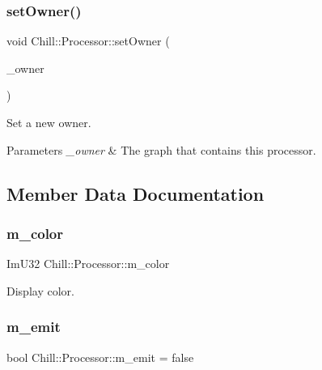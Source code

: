 \subsubsection{\texorpdfstring{set\+Owner()}{setOwner()}}
{\footnotesize\ttfamily void Chill\+::\+Processor\+::set\+Owner (\begin{DoxyParamCaption}\item[{\mbox{\hyperlink{class_chill_1_1_processing_graph}{Processing\+Graph}} $\ast$}]{\+\_\+owner }\end{DoxyParamCaption})\hspace{0.3cm}{\ttfamily [inline]}}

Set a new owner. 
\begin{DoxyParams}{Parameters}
{\em \+\_\+owner} & The graph that contains this processor. \\
\hline
\end{DoxyParams}


\subsection{Member Data Documentation}
\mbox{\label{class_chill_1_1_processor_ae473cb6e402c7454ed4225c70da8de6c}} 
\subsubsection{\texorpdfstring{m\+\_\+color}{m\_color}}
{\footnotesize\ttfamily Im\+U32 Chill\+::\+Processor\+::m\+\_\+color\hspace{0.3cm}{\ttfamily [protected]}}

Display color. \mbox{\label{class_chill_1_1_processor_afbe48b147ae854cca4b93dfb3e5f0e8a}} 
\subsubsection{\texorpdfstring{m\+\_\+emit}{m\_emit}}
{\footnotesize\ttfamily bool Chill\+::\+Processor\+::m\+\_\+emit = false\hspace{0.3cm}{\ttfamily [protected]}}

